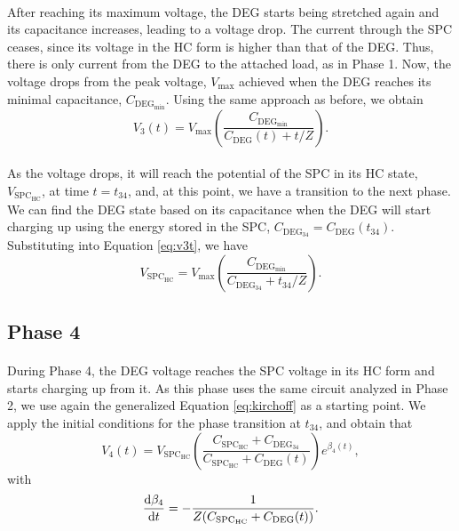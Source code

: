 \paragraph{} After reaching its maximum voltage, the DEG starts being stretched again and its capacitance increases, leading to a voltage drop. The current through the SPC ceases, since its voltage in the HC form is higher than that of the DEG. Thus, there is only current from the DEG to the attached load, as in Phase 1. Now, the voltage drops from the peak voltage, $V_\text{max}$ achieved when the DEG reaches its minimal capacitance, $C_{\text{DEG}_\text{min}}$. Using the same approach as before, we obtain
\begin{equation}\label{eq:v3t}
V_{3}(t) = V_\text{max}\left(\frac{C_{\text{DEG}_\text{min}}}{C_\text{DEG}(t)+t/Z}\right).
\end{equation}

\paragraph{} As the voltage drops, it will reach the potential of the SPC in its HC state, $V_{\text{SPC}_\text{HC}}$, at time $t=t_{34}$, and, at this point, we have a transition to the next phase. We can find the DEG state based on its capacitance when the DEG will start charging up using the energy stored in the SPC, $C_{\text{DEG}_{34}} = C_\text{DEG}(t_{34})$. Substituting into Equation \ref{eq:v3t}, we have
\begin{equation}
V_{\text{SPC}_\text{HC}} = V_\text{max}\left(\frac{C_{\text{DEG}_\text{min}}}{C_{\text{DEG}_{34}}+t_{34}/Z}\right).
\end{equation}

\subsection{Phase 4}

\paragraph{} During Phase 4, the DEG voltage reaches the SPC voltage in its HC form and starts charging up from it. As this phase uses the same circuit analyzed in Phase 2, we use again the generalized Equation \ref{eq:kirchoff} as a starting point. We apply the initial conditions for the phase transition at $t_{34}$, and obtain that
\begin{equation}\label{eq:v4t}
V_4(t) = V_{\text{SPC}_\text{HC}}\left(\frac{C_{\text{SPC}_\text{HC}}+C_{\text{DEG}_{34}}}{C_{\text{SPC}_\text{HC}}+C_\text{DEG}(t)}\right)e^{\beta_4(t)},
\end{equation}
with
\begin{equation}
\frac{\mathrm{d}\beta_4}{\mathrm{d}t} = -\frac{1}{Z(C_{\text{SPC}_\text{HC}}+C_\text{DEG}(t))}.
\end{equation}

